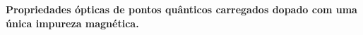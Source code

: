 \documentclass[pdf]{prosper}
\begin{document}
\begin{slide}{}
\textbf{Propriedades ópticas de pontos quânticos carregados dopado com uma única impureza magnética. }
\end{slide}
\end{document}
